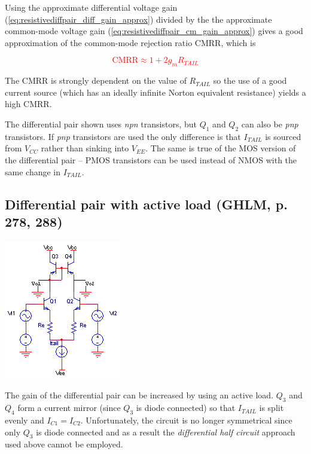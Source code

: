 \noindent Using the approximate differential voltage gain (\ref{eq:resistivediffpair_diff_gain_approx}) divided by the the approximate common-mode voltage gain (\ref{eq:resistivediffpair_cm_gain_approx}) gives a good approximation of the common-mode rejection ratio CMRR, which is

\textcolor{red}{
\begin{equation}
\text{CMRR} \approx 1+2g_{m}R_{TAIL}
\label{eq:resistivediffpair_CMRR}
\end{equation}
}

\noindent The CMRR is strongly dependent on the value of $R_{TAIL}$ so the use of a good current source (which has an ideally infinite Norton equivalent resistance) yields a high CMRR.
\par
The differential pair shown uses \textit{npn} transistors, but $Q_{1}$ and $Q_{2}$ can also be \textit{pnp} transistors. If \textit{pnp} transistors are used the only difference is that $I_{TAIL}$ is sourced from $V_{CC}$ rather than sinking into $V_{EE}$. The same is true of the MOS version of the differential pair -- PMOS transistors can be used instead of NMOS with the same change in $I_{TAIL}$.

\subsection{Differential pair with active load (GHLM, p. 278, 288)}
\begin{center}
	\includegraphics{schematics/differentialpair_activeload.PNG}
\end{center}
The gain of the differential pair can be increased by using an active load. $Q_{3}$ and $Q_{4}$ form a current mirror (since $Q_{3}$ is diode connected) so that $I_{TAIL}$ is split evenly and $I_{C1} = I_{C2}$. Unfortunately, the circuit is no longer symmetrical since only $Q_{3}$ is diode connected and as a result the \textsl{differential half circuit} approach used above cannot be employed.


